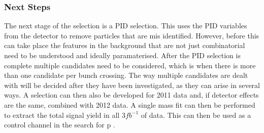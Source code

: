 \subsubsection{Next Steps}
\label{sec:next steps}

The next stage of the selection is a PID selection.  This uses the PID variables from the \lhcb detector to remove particles that are mis identified. However, before this can take place the features in the background that are not just combinatorial need to be understood and ideally paramaterised.  After the PID selection is complete multiple candidates need to be considered, which is when there is more than one \Bd candidate per bunch crossing.  The way multiple candidates are dealt with will be decided after they have been investigated, as they can arise in several ways. A selection can then also be developed for 2011 data and, if detector effects are the same, combined with 2012 data. A single mass fit can then be performed to extract the total signal yield in all $3fb^{-1}$ of data. This can then be used as a control channel in the search for \Lb \to p \Km \etaz.


\clearpage
